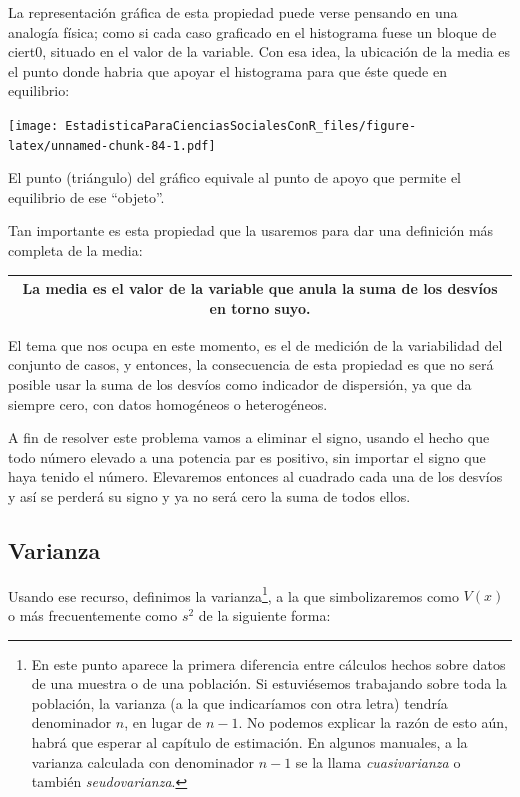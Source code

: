 \documentclass[]{book}
\let\rmarkdownfootnote\footnote%
\def\footnote{\protect\rmarkdownfootnote}
\begin{document}
La representación gráfica de esta propiedad puede verse pensando en una analogía física; como si cada caso graficado en el histograma fuese un bloque de ciert0, situado en el valor de la variable. Con esa idea, la ubicación de la media es el punto donde habria que apoyar el histograma para que éste quede en equilibrio:

\texttt{[image: EstadisticaParaCienciasSocialesConR\_files/figure-latex/unnamed-chunk-84-1.pdf]}

El punto (triángulo) del gráfico equivale al punto de apoyo que permite el equilibrio de ese ``objeto''.

Tan importante es esta propiedad que la usaremos para dar
una definición más completa de la media:

\begin{longtable}[]{@{}c@{}}
\toprule
\endhead
\begin{minipage}[t]{0.97\columnwidth}\centering
La \textbf{media} es el valor de la variable que anula la suma de los desvíos en torno suyo.\strut
\end{minipage}\tabularnewline
\bottomrule
\end{longtable}

El tema que nos ocupa en este momento, es el de medición de la
variabilidad del conjunto de casos, y entonces, la consecuencia de esta propiedad es que no será posible usar la suma de los desvíos como indicador de dispersión, ya que da siempre cero, con datos homogéneos o heterogéneos.

A fin de resolver este problema vamos a eliminar el signo, usando el
hecho que todo número elevado a una potencia par es positivo, sin
importar el signo que haya tenido el número. Elevaremos entonces al
cuadrado cada una de los desvíos y así se perderá su signo y ya no será cero la suma de todos ellos.

\hypertarget{varianza}{%
\subsection{Varianza}\label{varianza}}

Usando ese recurso, definimos la varianza\footnote{En este punto aparece la primera diferencia entre cálculos hechos sobre datos de una muestra o de una población. Si estuviésemos trabajando sobre toda la población, la varianza (a la que indicaríamos con otra letra) tendría denominador \(n\), en lugar de \(n-1\). No podemos explicar la razón de esto aún, habrá que esperar al capítulo de estimación. En algunos manuales, a la varianza calculada con denominador \(n-1\) se la llama \emph{cuasivarianza} o también \emph{seudovarianza}.}, a la que simbolizaremos como \(V(x)\) o más frecuentemente como \(s^2\) de la siguiente forma:
\end{document}
